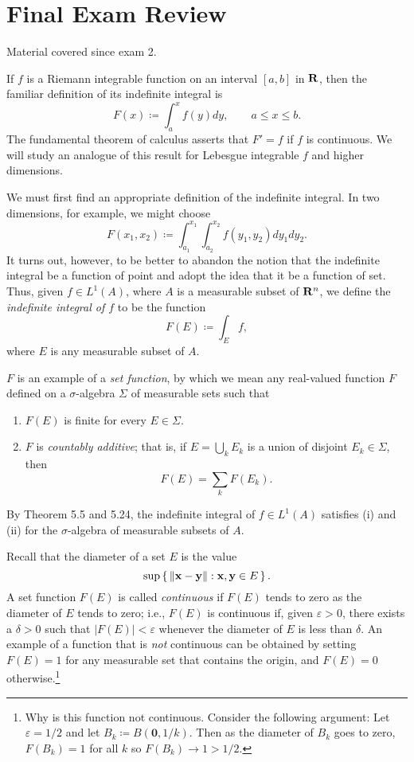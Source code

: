\section{Final Exam Review}
Material covered since exam 2.

\bigskip

If $f$ is a Riemann integrable function on an interval $[a,b]$ in $\mathbf{R}$,
then the familiar definition of its indefinite integral is
\[
F(x)\coloneqq\int_a^x f(y)dy,\qquad a\leq x\leq b.
\]
The fundamental theorem of calculus asserts that $F'=f$ if $f$ is
continuous. We will study an analogue of this result for Lebesgue
integrable $f$ and higher dimensions.

We must first find an appropriate definition of the indefinite integral. In
two dimensions, for example, we might choose
\[
F(x_1,x_2)\coloneqq\int_{a_1}^{x_1}\int_{a_2}^{x_2}f(y_1,y_2)dy_1dy_2.
\]
It turns out, however, to be better to abandon the notion that the
indefinite integral be a function of point and adopt the idea that it be a
function of set. Thus, given $f\in L^1(A)$, where $A$ is a measurable
subset of $\mathbf{R}^n$, we define the \emph{indefinite integral of $f$} to be
the function
\[
F(E)\coloneqq\int_E f,
\]
where $E$ is any measurable subset of $A$.

$F$ is an example of a \emph{set function}, by which we mean any
real-valued function $F$ defined on a $\sigma$-algebra $\Sigma$ of
measurable sets such that
\begin{enumerate}[label=(\roman*)]
\item $F(E)$ is finite for every $E\in\Sigma$.
\item $F$ is \emph{countably additive}; that is, if $E=\bigcup_k E_k$ is a
  union of disjoint $E_k\in\Sigma$, then
\[
F(E)=\sum_k F(E_k).
\]
\end{enumerate}
By Theorem 5.5 and 5.24, the indefinite integral of $f\in L^1(A)$ satisfies
(i) and (ii) for the $\sigma$-algebra of measurable subsets of $A$.

Recall that the diameter of a set $E$ is the value
\[
\sup\left\{\,\|\mathbf{x}-\mathbf{y}\|:\mathbf{x},\mathbf{y}\in E\,\right\}.
\]
A set function $F(E)$ is called \emph{continuous} if $F(E)$ tends to zero
as the diameter of $E$ tends to zero; i.e., $F(E)$ is continuous if, given
$\varepsilon>0$, there exists a $\delta>0$ such that $|F(E)|<\varepsilon$
whenever the diameter of $E$ is less than $\delta$. An example of a
function that is \emph{not} continuous can be obtained by setting $F(E)=1$
for any measurable set that contains the origin, and $F(E)=0$
otherwise.\footnote{Why is this function not continuous. Consider the
  following argument: Let $\varepsilon=1/2$ and let $B_k\coloneqq
  B(\mathbf{0},1/k)$. Then as the diameter of $B_k$ goes to zero,
  $F(B_k)=1$ for all $k$ so $F(B_k)\to 1>1/2$.}

